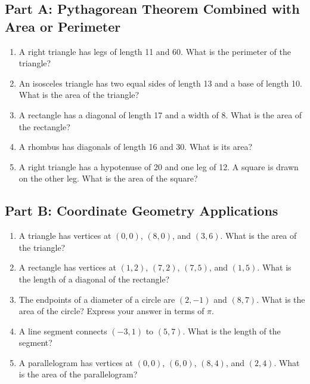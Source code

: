 \documentclass[14pt]{extarticle}
\begin{document}
\subsection*{Part A: Pythagorean Theorem Combined with Area or Perimeter}
\begin{enumerate}
  \item A right triangle has legs of length 11 and 60. What is the perimeter of the triangle?
  \item An isosceles triangle has two equal sides of length 13 and a base of length 10. What is the area of the triangle?
  \item A rectangle has a diagonal of length 17 and a width of 8. What is the area of the rectangle?
  \item A rhombus has diagonals of length 16 and 30. What is its area?
  \item A right triangle has a hypotenuse of 20 and one leg of 12. A square is drawn on the other leg. What is the area of the square?
\end{enumerate}

\subsection*{Part B: Coordinate Geometry Applications}
\begin{enumerate}
  \item A triangle has vertices at \((0, 0)\), \((8, 0)\), and \((3, 6)\). What is the area of the triangle?
  \item A rectangle has vertices at \((1, 2)\), \((7, 2)\), \((7, 5)\), and \((1, 5)\). What is the length of a diagonal of the rectangle?
  \item The endpoints of a diameter of a circle are \((2, -1)\) and \((8, 7)\). What is the area of the circle? Express your answer in terms of \(\pi\).
  \item A line segment connects \((-3, 1)\) to \((5, 7)\). What is the length of the segment?
  \item A parallelogram has vertices at \((0, 0)\), \((6, 0)\), \((8, 4)\), and \((2, 4)\). What is the area of the parallelogram?
\end{enumerate}
\end{document}
